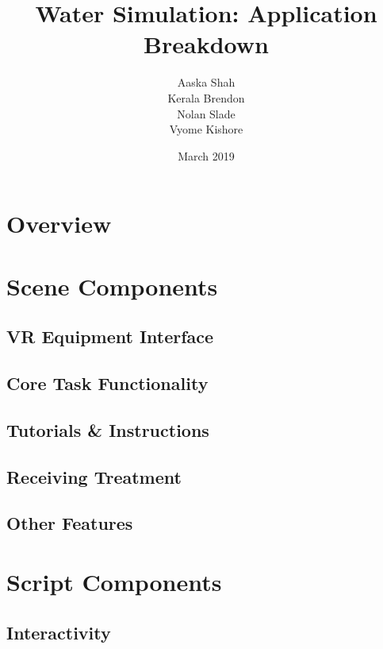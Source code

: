 \documentclass{article}
\title{Water Simulation: Application Breakdown}
\author{Aaska Shah\\Kerala Brendon\\Nolan Slade\\Vyome Kishore}
\date{March 2019}
\begin{document}
\maketitle


\section*{Overview}

\section*{Scene Components}
\subsection*{VR Equipment Interface} %

\subsection*{Core Task Functionality} %

\subsection*{Tutorials \& Instructions} %

\subsection*{Receiving Treatment} %

\subsection*{Other Features} %


\section*{Script Components}
\subsection*{Interactivity} %
\end{document}
